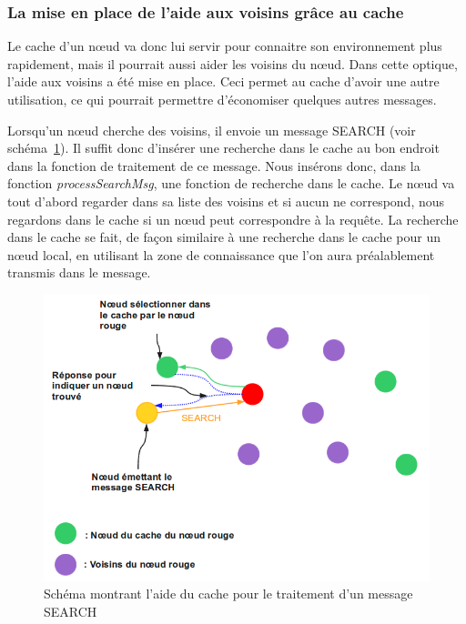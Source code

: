 \subsubsection{La mise en place de l'aide aux voisins grâce au cache}

Le cache d'un nœud va donc lui servir pour connaitre son environnement plus rapidement, mais il pourrait aussi aider les voisins du nœud. Dans cette optique, l'aide aux voisins a été mise en place. Ceci permet au cache d'avoir une autre utilisation, ce qui pourrait permettre d'économiser quelques autres messages. 
\par Lorsqu'un nœud cherche des voisins, il envoie un message SEARCH (voir schéma~\ref{schemaHelpCache}). Il suffit donc d'insérer une recherche dans le cache au bon endroit dans la fonction de traitement de ce message. Nous insérons donc, dans la fonction \textit{processSearchMsg}, une fonction de recherche dans le cache. Le nœud va tout d'abord regarder dans sa liste des voisins et si aucun ne correspond, nous regardons dans le cache si un nœud peut correspondre à la requête. La recherche dans le cache se fait, de façon similaire à une recherche dans le cache pour un nœud local, en utilisant la zone de connaissance que l'on aura préalablement transmis dans le message.

	\begin{figure}[!h]
        \centering
        \includegraphics[scale=0.4]{./Ressources/Images/cacheHelp.png}
        \caption{Schéma montrant l'aide du cache pour le traitement d'un message SEARCH}
        \label{schemaHelpCache}
        \end{figure}

